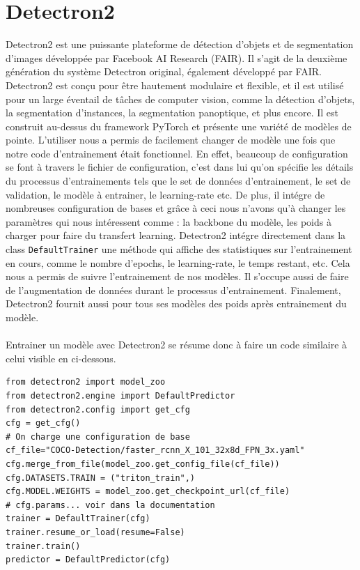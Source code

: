 \section{Detectron2}
Detectron2 est une puissante plateforme de détection d'objets et de segmentation d'images développée par Facebook AI Research (FAIR). Il s'agit de la deuxième génération du système Detectron original, également développé par FAIR. Detectron2 est conçu pour être hautement modulaire et flexible, et il est utilisé pour un large éventail de tâches de computer vision, comme la détection d'objets, la segmentation d'instances, la segmentation panoptique, et plus encore. Il est construit au-dessus du framework PyTorch et présente une variété de modèles de pointe. L'utiliser nous a permis de facilement changer de modèle une fois que notre code d'entrainement était fonctionnel.
En effet, beaucoup de configuration se font à travers le fichier de configuration, c'est dans lui qu'on spécifie les détails du processus d'entrainements tels que le set de données d'entrainement, le set de validation, le modèle à entrainer, le learning-rate etc. De plus, il intégre de nombreuses configuration de bases et grâce à ceci nous n'avons qu'à changer les paramètres qui nous intéressent comme : la backbone du modèle, les poids à charger pour faire du transfert learning. Detectron2 intégre directement dans la class \verb|DefaultTrainer| une méthode qui affiche des statistiques sur l'entrainement en cours, comme le nombre d'epochs, le learning-rate, le temps restant, etc. Cela nous a permis de suivre l'entrainement de nos modèles. Il s'occupe aussi de faire de l'augmentation de données durant le processus d'entrainement. Finalement, Detectron2 fournit aussi pour tous ses modèles des poids après entrainement du modèle.
\paragraph{}
Entrainer un modèle avec Detectron2 se résume donc à faire un code similaire à celui visible en ci-dessous.
\lstset{language=Python}
\begin{lstlisting}
from detectron2 import model_zoo
from detectron2.engine import DefaultPredictor
from detectron2.config import get_cfg
cfg = get_cfg()
# On charge une configuration de base
cf_file="COCO-Detection/faster_rcnn_X_101_32x8d_FPN_3x.yaml"
cfg.merge_from_file(model_zoo.get_config_file(cf_file))
cfg.DATASETS.TRAIN = ("triton_train",)
cfg.MODEL.WEIGHTS = model_zoo.get_checkpoint_url(cf_file)  
# cfg.params... voir dans la documentation
trainer = DefaultTrainer(cfg) 
trainer.resume_or_load(resume=False)
trainer.train()
predictor = DefaultPredictor(cfg)
\end{lstlisting}

